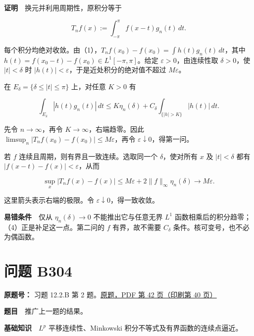 \documentclass[11pt,a4paper]{article}
\begin{document}
\textbf{证明}　换元并利用周期性，原积分等于

\begin{equation}
T_nf(x):=\int_{-\pi}^{\pi}f(x-t)g_n(t)\,dt.
\tag{3}
\end{equation}

每个积分均绝对收敛。由（1），\(T_nf(x_0)-f(x_0)=\int h(t)g_n(t)\,dt\)，其中
\(h(t)=f(x_0-t)-f(x_0)\in L^1[-\pi,\pi]\)。给定
\(\varepsilon>0\)，由连续性取 \(\delta>0\)，使 \(|t|<\delta\) 时
\(|h(t)|<\varepsilon\)，于是近处积分的绝对值不超过 \(M\varepsilon\)。

在 \(E_\delta=\{\delta\le|t|\le\pi\}\) 上，对任意 \(K>0\) 有

\begin{equation}
\int_{E_\delta}|h(t)g_n(t)|\,dt
\le K\eta_n(\delta)+C_\delta\int_{\{|h|>K\}}|h(t)|\,dt.
\tag{4}
\end{equation}

先令 \(n\to\infty\)，再令 \(K\to\infty\)，右端趋零。因此
\(\limsup_n|T_nf(x_0)-f(x_0)|\le M\varepsilon\)，再令
\(\varepsilon\downarrow0\)，得第一问。

若 \(f\) 连续且周期，则有界且一致连续。选取同一个 \(\delta\)，使对所有
\(x\) 及 \(|t|<\delta\) 都有 \(|f(x-t)-f(x)|<\varepsilon\)，从而

\begin{equation}
\sup_x|T_nf(x)-f(x)|
\le M\varepsilon+2\|f\|_\infty\eta_n(\delta)\longrightarrow M\varepsilon.
\tag{5}
\end{equation}

这里箭头表示右端的极限。令 \(\varepsilon\downarrow0\)，得一致收敛。

\textbf{易错条件}　仅从 \(\eta_n(\delta)\to0\) 不能推出它与任意无界
\(L^1\) 函数相乘后的积分趋零；（4）正是补足这一点。第二问的 \(f\)
有界，故不需要 \(C_\delta\) 条件。核可变号，也不必为偶函数。

\section{问题 B304}\label{ux95eeux9898-b304}

\textbf{原题号：} 习题 12.2.B 第 2
题。\href{https://zj139.github.io/math-notes/files/problems/楼分析习题-v2.pdf\#page=42}{原题，PDF
第 42 页（印刷第 40 页）}

\textbf{题目}　推广上一题的结果。

\textbf{基础知识}　\(L^p\) 平移连续性、Minkowski
积分不等式及有界函数的连续点逼近。
\end{document}
